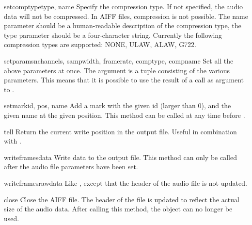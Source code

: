 \begin{funcdesc}{setcomptype}{type, name}
Specify the compression type.  If not specified, the audio data will
not be compressed.  In AIFF files, compression is not possible.  The
name parameter should be a human-readable description of the
compression type, the type parameter should be a four-character
string.  Currently the following compression types are supported:
NONE, ULAW, ALAW, G722.
\end{funcdesc}

\begin{funcdesc}{setparams}{nchannels, sampwidth, framerate, comptype, compname}
Set all the above parameters at once.  The argument is a tuple
consisting of the various parameters.  This means that it is possible
to use the result of a  call as argument to
.
\end{funcdesc}

\begin{funcdesc}{setmark}{id, pos, name}
Add a mark with the given id (larger than 0), and the given name at
the given position.  This method can be called at any time before
.
\end{funcdesc}

\begin{funcdesc}{tell}{}
Return the current write position in the output file.  Useful in
combination with .
\end{funcdesc}

\begin{funcdesc}{writeframes}{data}
Write data to the output file.  This method can only be called after
the audio file parameters have been set.
\end{funcdesc}

\begin{funcdesc}{writeframesraw}{data}
Like , except that the header of the audio file is
not updated.
\end{funcdesc}

\begin{funcdesc}{close}{}
Close the AIFF file.  The header of the file is updated to reflect the
actual size of the audio data. After calling this method, the object
can no longer be used.
\end{funcdesc}
